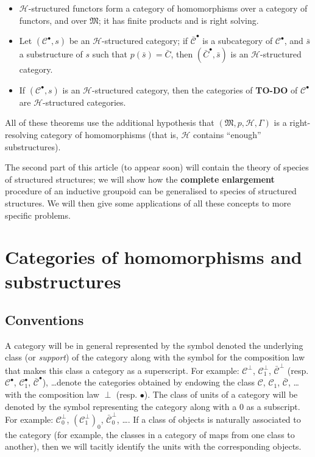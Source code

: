\documentclass[a4paper,oneside,nobib,nofonts,notitlepage,notoc,nols,fleqn,justified]{tufte-book}
\newcommand{\todo}{{\color{purple}\textbf{TO-DO }}}
\newcommand{\unsure}[1]{{\color{purple}\textbf{#1}}}
\newcommand{\CC}{\mathcal{C}}
\newcommand{\HH}{\mathcal{H}}
\newcommand{\MM}{\mathfrak{M}}
\begin{document}
\begin{itemize}
  \item $\HH$-structured functors form a category of homomorphisms over a category of functors, and over $\MM$;
    it has finite products and is right solving.
  \item Let $(\CC^\bullet,s)$ be an $\HH$-structured category;
    if $\bar{\CC}^\bullet$ is a subcategory of $\CC^\bullet$, and $\bar{s}$ a substructure of $s$ such that $p(\bar{s})=\bar{C}$, then $(\bar{C}^\bullet,\bar{s})$ is an $\HH$-structured category.
  \item If $(\CC^\bullet,s)$ is an $\HH$-structured category, then the categories of \todo of $\CC^\bullet$ are $\HH$-structured categories.
\end{itemize}

All of these theorems use the additional hypothesis that $(\MM,p,\HH,\Gamma)$ is a right-resolving category of homomorphisms (that is, $\HH$ contains ``enough'' substructures).

The second part of this article (to appear soon) will contain the theory of species of structured structures;
we will show how the \unsure{complete enlargement} procedure of an inductive groupoid can be generalised to species of structured structures.
We will then give some applications of all these concepts to more specific problems.



\section{Categories of homomorphisms and substructures}
\label{section:i}

\subsection{Conventions}
\label{section:i.1}

A category will be in general represented by the symbol denoted the underlying class (or \emph{support}) of the category along with the symbol for the composition law that makes this class a category as a superscript.
For example: $\CC^\perp$, $\CC_1^\perp$, $\bar{\CC}^\perp$ (resp. $\CC^\bullet$, $\CC_1^\bullet$, $\bar{\CC}^\bullet$), \ldots denote the categories obtained by endowing the class $\CC$, $\CC_1$, $\bar{\CC}$, \ldots with the composition law $\perp$ (resp. $\bullet$).
The class of units of a category will be denoted by the symbol representing the category along with a $0$ as a subscript.
For example: $\CC_0^\perp$, $(\CC_1^\perp)_0$, $\bar{\CC}_0^\perp$, \ldots.
If a class of objects is naturally associated to the category (for example, the classes in a category of maps from one class to another), then we will tacitly identify the units with the corresponding objects.
\end{document}
